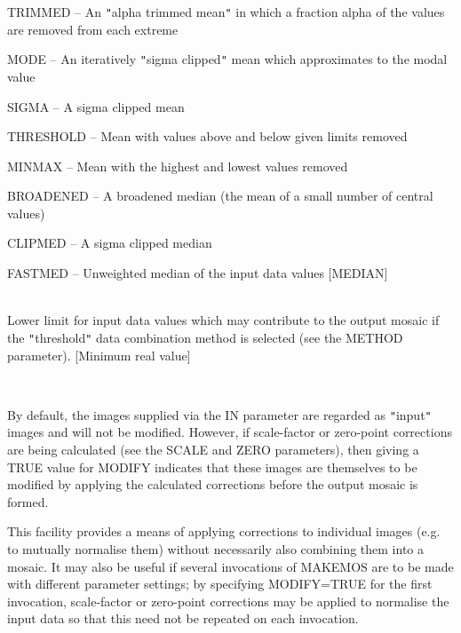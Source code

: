 \documentclass[twoside,11pt]{article}
\renewcommand{\_}{\texttt{\symbol{95}}}
\newcommand{\qt}[1]{{\tt "}#1{\tt "}}
\newcommand{\routine}[1]{{\sc #1}}
\newcommand{\sstsubsection}[1]{ \item[{#1}] \mbox{} \\}
\newcommand{\sstitem}{\item}
\newcommand{\sstsubsection}[1]{\item[{#1}]}
\newcommand{\sstitem}{\item}
\begin{document}
{{{{            \sstitem
               TRIMMED   -- An \qt{alpha trimmed mean} in which a fraction
                               alpha of the values are removed from
                               each extreme

            \sstitem
               MODE      -- An iteratively \qt{sigma clipped} mean which
                               approximates to the modal value

            \sstitem
               SIGMA     -- A sigma clipped mean

            \sstitem
               THRESHOLD -- Mean with values above and below given
                               limits removed

            \sstitem
               MINMAX    -- Mean with the highest and lowest values
                               removed

            \sstitem
               BROADENED -- A broadened median (the mean of a small
                               number of central values)
            \sstitem
               CLIPMED   -- A sigma clipped median

            \sstitem
               FASTMED   -- Unweighted median of the input data values
            [MEDIAN]
         }
      }
      \sstsubsection{
         MIN = \_REAL (Read)
      } {
         Lower limit for input data values which may contribute to the
         output mosaic if the \qt{threshold} data combination method is
         selected (see the METHOD parameter).
         [Minimum real value]
      }
      \sstsubsection{
         MODIFY = \_LOGICAL (Read)
      } {
         By default, the images supplied via the IN parameter are
         regarded as \qt{input} images and will not be modified. However, if
         scale-factor or zero-point corrections are being calculated
         (see the SCALE and ZERO parameters), then giving a TRUE value
         for MODIFY indicates that these images are themselves to be
         modified by applying the calculated corrections before the
         output mosaic is formed.

         This facility provides a means of applying corrections to
         individual images (e.g. to mutually normalise them) without
         necessarily also combining them into a mosaic. It may also be
         useful if several invocations of \routine{MAKEMOS} are to be made with
         different parameter settings; by specifying MODIFY=TRUE for
         the first invocation, scale-factor or zero-point corrections
         may be applied to normalise the input data so that this need
         not be repeated on each invocation.

}}}
\end{document}
